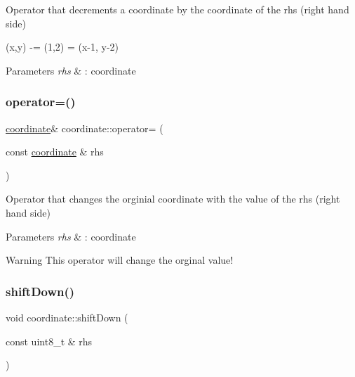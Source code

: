 Operator that decrements a coordinate by the coordinate of the rhs (right hand side) 

(x,y) -\/= (1,2) = (x-\/1, y-\/2) 
\begin{DoxyParams}{Parameters}
{\em rhs} & \+: coordinate \\
\hline
\end{DoxyParams}
\mbox{\label{classcoordinate_a2b84fb6537df4d1247ae5a85d9c47284}} 
\subsubsection{\texorpdfstring{operator=()}{operator=()}}
{\footnotesize\ttfamily \hyperlink{classcoordinate}{coordinate}\& coordinate\+::operator= (\begin{DoxyParamCaption}\item[{const \hyperlink{classcoordinate}{coordinate} \&}]{rhs }\end{DoxyParamCaption})\hspace{0.3cm}{\ttfamily [inline]}}



Operator that changes the orginial coordinate with the value of the rhs (right hand side) 


\begin{DoxyParams}{Parameters}
{\em rhs} & \+: coordinate \\
\hline
\end{DoxyParams}
\begin{DoxyWarning}{Warning}
This operator will change the orginal value! 
\end{DoxyWarning}
\mbox{\label{classcoordinate_ae93ac2c7bceab17c68d3b4602165953b}} 
\subsubsection{\texorpdfstring{shift\+Down()}{shiftDown()}}
{\footnotesize\ttfamily void coordinate\+::shift\+Down (\begin{DoxyParamCaption}\item[{const uint8\+\_\+t \&}]{rhs }\end{DoxyParamCaption})\hspace{0.3cm}{\ttfamily [inline]}}



